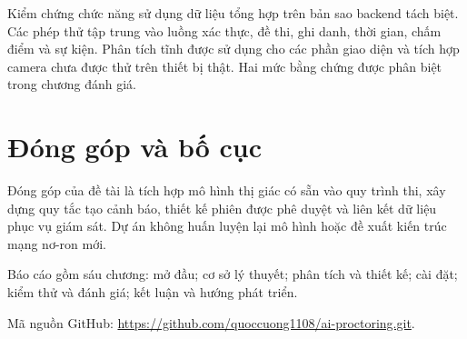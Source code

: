 Kiểm chứng chức năng sử dụng dữ liệu tổng hợp trên bản sao backend tách biệt. Các phép thử tập trung vào luồng xác thực, đề thi, ghi danh, thời gian, chấm điểm và sự kiện. Phân tích tĩnh được sử dụng cho các phần giao diện và tích hợp camera chưa được thử trên thiết bị thật. Hai mức bằng chứng được phân biệt trong chương đánh giá.

\section{Đóng góp và bố cục}
Đóng góp của đề tài là tích hợp mô hình thị giác có sẵn vào quy trình thi, xây dựng quy tắc tạo cảnh báo, thiết kế phiên được phê duyệt và liên kết dữ liệu phục vụ giám sát. Dự án không huấn luyện lại mô hình hoặc đề xuất kiến trúc mạng nơ-ron mới.

Báo cáo gồm sáu chương: mở đầu; cơ sở lý thuyết; phân tích và thiết kế; cài đặt; kiểm thử và đánh giá; kết luận và hướng phát triển.

\noindent Mã nguồn GitHub: \url{https://github.com/quoccuong1108/ai-proctoring.git}.
